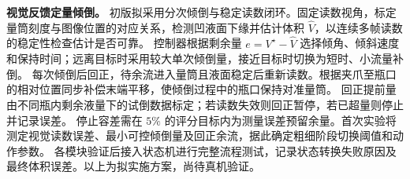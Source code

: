 \textbf{视觉反馈定量倾倒。}
初版拟采用分次倾倒与稳定读数闭环。固定读数视角，标定量筒刻度与图像位置的对应关系，检测凹液面下缘并估计体积 $\hat V$，以连续多帧读数的稳定性检查估计是否可靠。
控制器根据剩余量 $e=V^\star-\hat V$ 选择倾角、倾斜速度和保持时间；远离目标时采用较大单次倾倒量，接近目标时切换为短时、小流量补倒。
每次倾倒后回正，待余流进入量筒且液面稳定后重新读数。根据夹爪至瓶口的相对位置同步补偿末端平移，使倾倒过程中的瓶口保持对准量筒。
回正提前量由不同瓶内剩余液量下的试倒数据标定；若读数失效则回正暂停，若已超量则停止并记录误差。
停止容差需在 $5\%$ 的评分目标内为测量误差预留余量。首次实验将测定视觉读数误差、最小可控倾倒量及回正余流，据此确定粗细阶段切换阈值和动作参数。
各模块验证后接入状态机进行完整流程测试，记录状态转换失败原因及最终体积误差。以上为拟实施方案，尚待真机验证。
